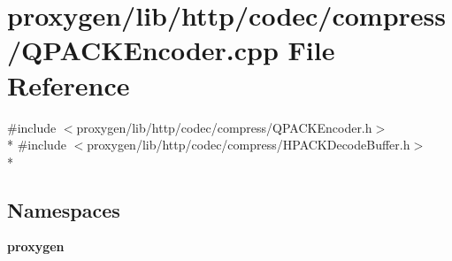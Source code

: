 \section{proxygen/lib/http/codec/compress/\+Q\+P\+A\+C\+K\+Encoder.cpp File Reference}
\label{QPACKEncoder_8cpp}
{\ttfamily \#include $<$proxygen/lib/http/codec/compress/\+Q\+P\+A\+C\+K\+Encoder.\+h$>$}\\*
{\ttfamily \#include $<$proxygen/lib/http/codec/compress/\+H\+P\+A\+C\+K\+Decode\+Buffer.\+h$>$}\\*
\subsection*{Namespaces}
\begin{DoxyCompactItemize}
\item 
 {\bf proxygen}
\end{DoxyCompactItemize}
